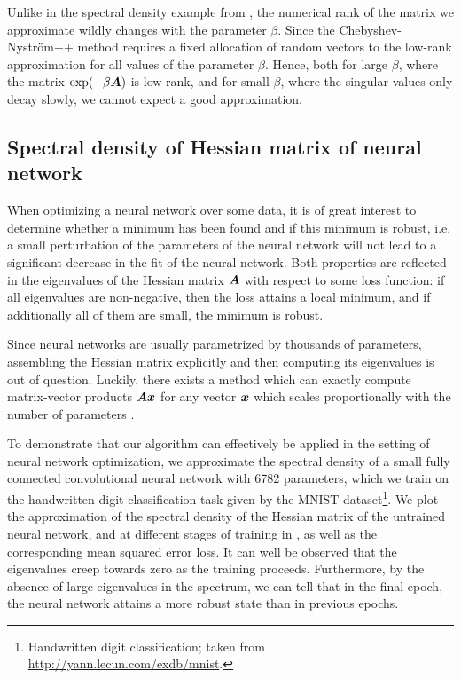 Unlike in the spectral density example from , the numerical rank of the matrix we approximate wildly changes with the parameter $\beta$. Since the Chebyshev-Nyström++ method requires a fixed allocation of random vectors to the low-rank approximation for all values of the parameter $\beta$. Hence, both for large $\beta$, where the matrix $\exp(-\beta \boldsymbol{A})$ is low-rank, and for small $\beta$, where the singular values only decay slowly, we cannot expect a good approximation.

\subsection{Spectral density of Hessian matrix of neural network}
\label{subsec:hessian}

When optimizing a neural network over some data, it is of great interest to determine whether a minimum has been found and if this minimum is robust, i.e. a small perturbation of the parameters of the neural network will not lead to a significant decrease in the fit of the neural network. Both properties are reflected in the eigenvalues of the Hessian matrix $\boldsymbol{A}$ with respect to some loss function: if all eigenvalues are non-negative, then the loss attains a local minimum, and if additionally all of them are small, the minimum is robust.

Since neural networks are usually parametrized by thousands of parameters, assembling the Hessian matrix explicitly and then computing its eigenvalues is out of question. Luckily, there exists a method which can exactly compute matrix-vector products $\boldsymbol{A} \boldsymbol{x}$ for any vector $\boldsymbol{x}$ which scales proportionally with the number of parameters \cite{pearlmutter-1994-fast-exact}.

To demonstrate that our algorithm can effectively be applied in the setting of neural network optimization, we approximate the spectral density of a small fully connected convolutional neural network with 6782 parameters, which we train on the handwritten digit classification task given by the MNIST dataset\footnote{Handwritten digit classification; taken from \url{http://yann.lecun.com/exdb/mnist}.}. We plot the approximation of the spectral density of the Hessian matrix of the untrained neural network, and at different stages of training in , as well as the corresponding mean squared error loss. It can well be observed that the eigenvalues creep towards zero as the training proceeds. Furthermore, by the absence of large eigenvalues in the spectrum, we can tell that in the final epoch, the neural network attains a more robust state than in previous epochs.

